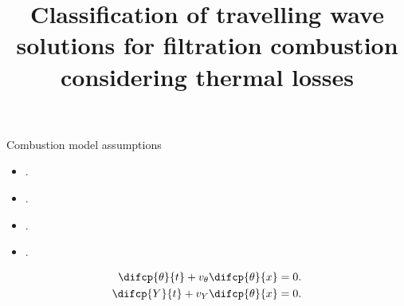 \title{Classification of travelling wave solutions for filtration combustion considering thermal losses}



\begin{frame}
    \begin{block}{Combustion model assumptions}
        \begin{itemize}
            \item .
            \item .
            \item .
            \item .
        \end{itemize}
    \end{block}

    \begin{align*}
        \difcp{\theta}{t}+v_{\theta}\difcp{\theta}{x} & =0. \\
        \difcp{Y}{t}+v_{Y}\difcp{\theta}{x}           & =0. \\
    \end{align*}
\end{frame}

